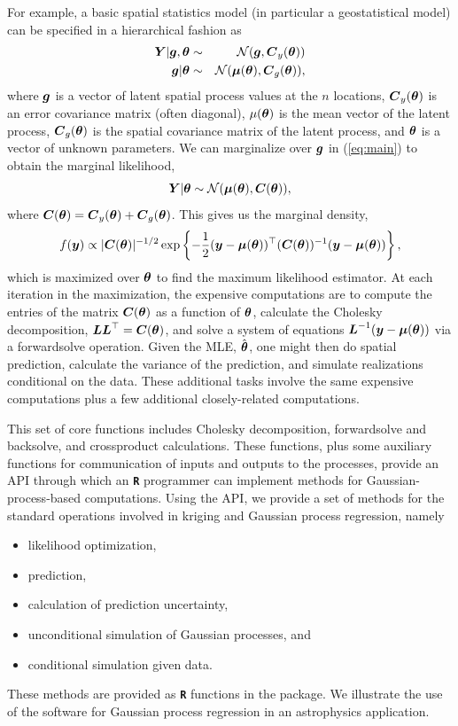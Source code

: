 \documentclass[12pt]{article}
\newcommand{\proglang}[1]{\textbf{\texttt{#1}}}
\newcommand{\bm}[1]{\mbox{\boldmath $#1$}}
\begin{document}
For example, a
basic spatial statistics model (in particular a geostatistical model) can be specified in a hierarchical fashion as
\begin{eqnarray*}
\bm{Y}|\bm{g},\bm{\theta} & \sim & \mathcal{N}(\bm{g},\bm{C}_y(\bm{\theta}))\\
\bm{g}|\bm{\theta} & \sim & \mathcal{N}(\bm{\mu}(\bm{\theta}),\bm{C}_g(\bm{\theta})),\label{eq:main}
\end{eqnarray*}
 where $\bm{g}$ is a vector of latent spatial process values at the $n$ locations, $\bm{C}_y(\bm{\theta})$ is an error covariance matrix (often diagonal), $\mu(\bm{\theta})$ is the mean vector of the latent process, $\bm{C}_g(\bm{\theta})$ is the spatial covariance matrix of the latent process, and $\bm{\theta}$ is a vector of unknown parameters.
We can marginalize over $\bm{g}$ in (\ref{eq:main}) to obtain the marginal likelihood,
\[
\bm{Y}|\bm{\theta} \sim\mathcal{N}(\bm{\mu}(\bm{\theta}), \bm{C}(\bm{\theta})),\]
where $\bm{C}(\bm{\theta}) = \bm{C}_y(\bm{\theta}) + \bm{C}_g(\bm{\theta})$. 
This gives us the marginal density,
\[f(\bm{y})\propto|\bm{C}(\bm{\theta})|^{-1/2}\exp\left\{
  -\frac{1}{2}(\bm{y}-\bm{\mu}(\bm{\theta}))^{\top}(\bm{C}(\bm{\theta}))^{-1}(\bm{y}-\bm{\mu}(\bm{\theta}))\right\}, \]
which is maximized over $\bm{\theta}$ to find the maximum
likelihood estimator. At each iteration 
in the maximization, the expensive computations are to compute the entries of the matrix $\bm{C}(\bm{\theta})$ as a function of $\bm{\theta}$, calculate the Cholesky decomposition,
$\bm{LL}^{\top}=\bm{C}(\bm{\theta})$, and solve a system of
equations $\bm{L}^{-1}(\bm{y}-\bm{\mu}(\bm{\theta}))$ via a forwardsolve operation. Given the MLE, $\hat{\bm{\theta}}$,
one might then do spatial prediction, calculate the variance of the prediction, and simulate
realizations conditional on the data. These additional tasks involve the same expensive computations plus
a few additional closely-related computations.  

  This set of core
functions includes Cholesky decomposition, forwardsolve and backsolve, and crossproduct calculations. These functions, plus some auxiliary functions for communication of inputs
and outputs to the processes, provide an API through which an \proglang{R}
programmer can implement methods for Gaussian-process-based
computations. Using the API, we provide a set of methods for the
standard operations involved in kriging and Gaussian process
regression, namely 
\begin{itemize}
\item likelihood optimization, 
\item prediction,
\item calculation of prediction uncertainty, 
\item unconditional simulation of
Gaussian processes, and 
\item conditional simulation given data.
\end{itemize}
These
methods are provided as \proglang{R} functions in the package. We
illustrate the use of the software for Gaussian process regression in
an astrophysics application.
\end{document}
